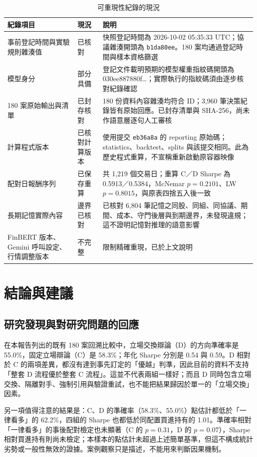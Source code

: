 \begin{table}[H]
\centering\small
\caption{可重現性紀錄的現況}
\label{tab:prov}
\begin{tabularx}{\textwidth}{@{}L{.25} L{.15} Y@{}}
\toprule
紀錄項目 & 現況 & 說明 \\
\midrule
事前登記時間與實驗規則雜湊值 & 已核對 & 快照登記時間為 2026-10-02 05:35:33 UTC；協議雜湊開頭為 \texttt{b1da80ee}。180 案均通過登記時間與樣本資格篩選 \\
模型身分 & 部分具備 & 登記文件載明預期的模型權重指紋碼開頭為 030ee887880f…；實際執行的指紋碼須由逐步核對紀錄確認 \\
180 案原始輸出與清單 & 已封存核對 & 180 份資料內容雜湊均符合 ID；3,960 筆決策紀錄皆有原始回應。已封存清單與 SHA-256，尚未作語意層逐句人工審核 \\
計算程式版本 & 已核對計算版本 & 使用提交 \texttt{eb36a8a} 的 reporting 原始碼；statistics、backtest、splits 與該提交相同。此為歷史程式重算，不宣稱重新啟動原容器映像 \\
配對日報酬序列 & 已保存重算 & 共 1,219 個交易日；重算 C／D Sharpe 為 0.5913／0.5384，McNemar $p=0.2101$、LW $p=0.8015$，與原表四捨五入後一致 \\
長期記憶實際內容 & 邊界已核對 & 已核對 6,804 筆記憶之同股、同組、同協議、期間、成本、守門後層與到期邊界，未發現違規；這不證明記憶對推理的語意影響 \\
FinBERT 版本、Gemini 呼叫設定、行情調整版本 & 不完整 & 限制精確重現，已於上文說明 \\
\bottomrule
\end{tabularx}
\end{table}


\clearpage\section{結論與建議}

\subsection{研究發現與對研究問題的回應}

在本報告列出的既有 180 案回溯比較中，立場交換辯論（D）的方向準確率是 55.0\%，固定立場辯論（C）是 58.3\%；年化 Sharpe 分別是 0.54 與 0.59。D 相對於 C 的兩項差異，都沒有達到事先訂定的「優越」判準，因此目前的資料不支持「整套 D 流程優於整套 C 流程」。這並不代表兩組一樣好；而且 D 同時包含立場交換、隔離對手、強制引用與驗證重試，也不能把結果歸因於單一的「立場交換」因素。

另一項值得注意的結果是：C、D 的準確率（58.3\%、55.0\%）點估計都低於「一律看多」的 62.2\%，四組的 Sharpe 也都低於同配置買進持有的 1.01。準確率相對「一律看多」的事後配對檢定也未顯著（C 的 $p=0.31$，D 的 $p=0.07$），Sharpe 相對買進持有則尚未檢定；本樣本的點估計未超過上述簡單基準，但這不構成統計劣勢或一般性無效的證據。案例觀察只是描述，不能用來判斷因果機制。

